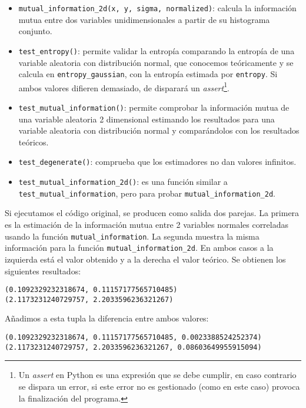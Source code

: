 \documentclass[12pt,a4paper]{report} %
\theoremstyle{definition}
\begin{document}
\begin{itemize}
\item \texttt{mutual\_information\_2d(x, y, sigma, normalized)}: calcula la información mutua entre dos variables unidimensionales a partir de su histograma conjunto. 

\item \texttt{test\_entropy()}: permite validar la entropía comparando la entropía de una variable aleatoria con distribución normal, que conocemos teóricamente y se calcula en \texttt{entropy\_gaussian}, con la entropía estimada por \texttt{entropy}. Si ambos valores difieren demasiado, de disparará un \textit{assert}\footnote{Un \textit{assert} en Python es una expresión que se debe cumplir, en caso contrario se dispara un error, si este error no es gestionado (como en este caso) provoca la finalización del programa.}.

\item \texttt{test\_mutual\_information()}: permite comprobar la información mutua de una variable aleatoria 2 dimensional estimando los resultados para una variable aleatoria con distribución normal y comparándolos con los resultados teóricos.

\item \texttt{test\_degenerate()}: comprueba que los estimadores no dan valores infinitos.

\item \texttt{test\_mutual\_information\_2d()}: es una función similar a \texttt{test\_mutual\_information}, pero para probar \texttt{mutual\_information\_2d}.
\end{itemize} 

Si ejecutamos el código original, se producen como salida dos parejas. La primera es la estimación de la información mutua entre 2 variables normales correladas usando la función \texttt{mutual\_information}. La segunda muestra la misma información para la función \texttt{mutual\_information\_2d}. En ambos casos a la izquierda está el valor obtenido y a la derecha el valor teórico. Se obtienen los siguientes resultados:
\begin{lstlisting}
(0.1092329232318674, 0.11157177565710485)
(2.1173231240729757, 2.2033596236321267)
\end{lstlisting}

Añadimos a esta tupla la diferencia entre ambos valores:
\begin{lstlisting}
(0.1092329232318674, 0.11157177565710485, 0.0023388524252374)
(2.1173231240729757, 2.2033596236321267, 0.08603649955915094)
\end{lstlisting}
\end{document}
